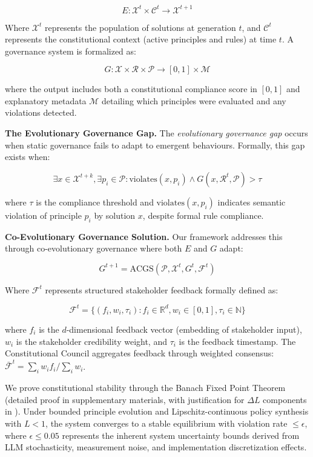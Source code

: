 \documentclass[manuscript,screen,review,anonymous,9pt]{acmart}
\begin{document}
$$E: \mathcal{X}^t \times \mathcal{C}^t \rightarrow \mathcal{X}^{t+1}$$

Where $\mathcal{X}^t$ represents the population of solutions at generation $t$, and $\mathcal{C}^t$ represents the constitutional context (active principles and rules) at time $t$. A governance system is formalized as:

$$G: \mathcal{X} \times \mathcal{R} \times \mathcal{P} \rightarrow [0,1] \times \mathcal{M}$$

where the output includes both a constitutional compliance score in $[0,1]$ and explanatory metadata $\mathcal{M}$ detailing which principles were evaluated and any violations detected.

\textbf{The Evolutionary Governance Gap.} The \textit{evolutionary governance gap} occurs when static governance fails to adapt to emergent behaviours. Formally, this gap exists when:

$$\exists x \in \mathcal{X}^{t+k}, \exists p_i \in \mathcal{P}: \text{violates}(x, p_i) \land G(x, \mathcal{R}^t, \mathcal{P}) > \tau$$

where $\tau$ is the compliance threshold and $\text{violates}(x, p_i)$ indicates semantic violation of principle $p_i$ by solution $x$, despite formal rule compliance.

\textbf{Co-Evolutionary Governance Solution.} Our framework addresses this through co-evolutionary governance where both $E$ and $G$ adapt:

$$G^{t+1} = \text{ACGS}(\mathcal{P}, \mathcal{X}^t, G^t, \mathcal{F}^t)$$

Where $\mathcal{F}^t$ represents structured stakeholder feedback formally defined as:

$$\mathcal{F}^t = \{(f_i, w_i, \tau_i) : f_i \in \mathbb{R}^d, w_i \in [0,1], \tau_i \in \mathbb{N}\}$$

where $f_i$ is the $d$-dimensional feedback vector (embedding of stakeholder input), $w_i$ is the stakeholder credibility weight, and $\tau_i$ is the feedback timestamp. The Constitutional Council aggregates feedback through weighted consensus: $\bar{\mathcal{F}}^t = \sum_{i} w_i f_i / \sum_{i} w_i$.

We prove constitutional stability through the Banach Fixed Point Theorem (detailed proof in supplementary materials, with justification for $\Delta L$ components in ). Under bounded principle evolution and Lipschitz-continuous policy synthesis with $L < 1$, the system converges to a stable equilibrium with violation rate $\leq \epsilon$, where $\epsilon \leq 0.05$ represents the inherent system uncertainty bounds derived from LLM stochasticity, measurement noise, and implementation discretization effects.
\end{document}
